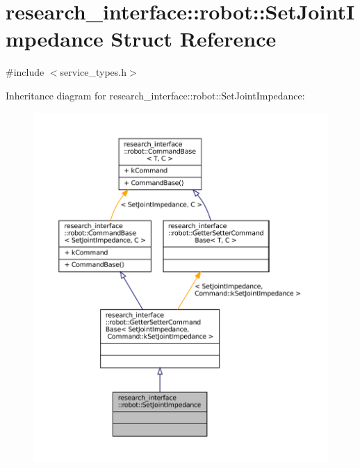 \hypertarget{structresearch__interface_1_1robot_1_1SetJointImpedance}{}\section{research\+\_\+interface\+:\+:robot\+:\+:Set\+Joint\+Impedance Struct Reference}
\label{structresearch__interface_1_1robot_1_1SetJointImpedance}


{\ttfamily \#include $<$service\+\_\+types.\+h$>$}



Inheritance diagram for research\+\_\+interface\+:\+:robot\+:\+:Set\+Joint\+Impedance\+:
\nopagebreak
\begin{figure}[H]
\begin{center}
\leavevmode
\includegraphics[width=350pt]{structresearch__interface_1_1robot_1_1SetJointImpedance__inherit__graph}
\end{center}
\end{figure}


